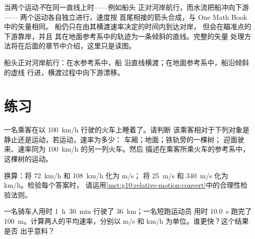 \begin{remark}[两个方向同时存在]\label{rem:g10:relative-motion:twodim}
当两个运动\emph{不}在同一直线上时——例如船头
正对河岸航行，而水流把船冲向下游——
两个运动各自独立进行，速度按
首尾相接的箭头合成，与 One Math Book 中的矢量相同。
船仍只在由其横渡速率决定的时间内到达对岸，
但会在瞄准点的下游靠岸，并且
其在地面参考系中的轨迹为一条倾斜的直线。完整的矢量
处理方法将在后面的章节中介绍，这里只是读图。
\end{remark}

\begin{omfigure}

{\small 船头正对河岸航行：在水参考系中，船
沿直线横渡；在地面参考系中，船沿倾斜的虚线
行进，横渡过程中向下游漂移。}
\end{omfigure}

\section{练习}

\begin{exercise}[$\star$]\label{exo:g10:relative-motion:1}
一名乘客在以 \qty{100}{km/h} 行驶的火车上睡着了。请判断
该乘客相对于下列对象是静止还是运动，若运动，速率为多少：
车厢；地面；铁轨旁的一棵树；
迎面驶来、速率同为 \qty{100}{km/h} 的另一列火车。然后
描述在乘客所乘火车的参考系中，这棵树的运动。
\end{exercise}

\begin{exercise}[$\star$]\label{exo:g10:relative-motion:2}
换算：将 \qty{72}{km/h} 和 \qty{108}{km/h} 化为 \unit{m/s}；
将 \qty{25}{m/s} 和 \qty{340}{m/s} 化为 \unit{km/h}。检验每个答案时，
请运用\cref{met:g10:relative-motion:convert}中的合理性检验法则。
\end{exercise}

\begin{exercise}[$\star$]\label{exo:g10:relative-motion:3}
一名骑车人用时 \qty{1}{h}~\qty{30}{min} 行驶了 \qty{36}{km}；一名短跑运动员
用时 \qty{10.0}{s} 跑完了 \qty{100}{m}。计算两人的平均速率，分别以
\unit{m/s} 和 \unit{km/h} 为单位。谁更快？这个结果是否
出乎意料？
\end{exercise}

